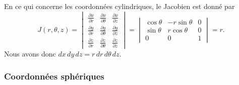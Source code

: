 En ce qui concerne les coordonnées cylindriques, le Jacobien est donné par
\begin{equation}
    J(r,\theta,z)=\begin{vmatrix}
        \frac{ \partial x }{ \partial r }    &   \frac{ \partial x }{ \partial \theta }    &   \frac{ \partial x }{ \partial z }    \\
        \frac{ \partial y }{ \partial r }    &   \frac{ \partial y }{ \partial \theta }    &   \frac{ \partial y }{ \partial z }    \\
        \frac{ \partial z }{ \partial r }    &   \frac{ \partial z }{ \partial \theta }    &   \frac{ \partial z }{ \partial z }
    \end{vmatrix}=
    \begin{vmatrix}
        \cos\theta    &   -r\sin\theta    &   0    \\
        \sin\theta    &   r\cos\theta    &   0    \\
        0    &   0    &   1
    \end{vmatrix}=r.
\end{equation}
Nous avons donc $dx\,dy\,dz=r\,dr\,d\theta\,dz$.

\subsubsection{Coordonnées sphériques}


